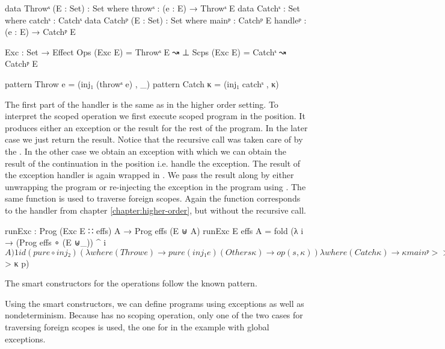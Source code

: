 \begin{code}
data Throwˢ (E : Set)  : Set where throwˢ : (e : E) → Throwˢ E
data Catchˢ            : Set where catchˢ : Catchˢ
data Catchᵖ (E : Set)  : Set where
  mainᵖ    : Catchᵖ E
  handleᵖ  : (e : E) → Catchᵖ E

Exc : Set → Effect
Ops   (Exc E) = Throwˢ E  ↝ ⊥
Scps  (Exc E) = Catchˢ    ↝ Catchᵖ E

pattern Throw  e = (inj₁ (throwˢ e) , _)
pattern Catch  κ = (inj₁ catchˢ , κ)
\end{code}
The first part of the handler is the same as in the higher order setting.
To interpret the scoped operation  we first execute scoped
program in the  position.
It produces either an exception or the result for the rest of the program.
In the later case we just return the result.
Notice that the recursive call was taken care of by the .
In the other case we obtain an exception  with which we can
obtain the result of the continuation in the 
position i.e. handle the exception.
The result of the exception handler is again wrapped in .
We pass the result along by either unwrapping the program or re-injecting the
exception in the program using .
The same function is used to traverse foreign scopes.
Again the function corresponds to the handler from chapter
\ref{chapter:higher-order}, but without the recursive call.

\begin{code}
runExc : Prog (Exc E ∷ effs) A → Prog effs (E ⊎ A)
runExc {E} {effs} {A} = fold (λ i → (Prog effs ∘ (E ⊎_)) ^ i $ A) 1 id
  (pure ∘ inj₂)
  ( λ where
    (Throw e)    → pure (inj₁ e)
    (Other s κ)  → op (s , κ)
  ) λ where
    (Catch κ) → κ mainᵖ >>= λ where
      (inj₁ e)  → κ (handleᵖ e) >>= [ pure ∘ inj₁ , id ]
      (inj₂ x)  → x
    (Other s κ) → scp (s , λ p → [ pure ∘ inj₁ , id ] <$> κ p)
\end{code}
The smart constructors for the operations follow the known pattern.

Using the smart constructors, we can define programs using exceptions as well as nondeterminism.
Because  has no scoping operation, only one of the two
cases for traversing foreign scopes is used, the one for 
in the example with global exceptions.

